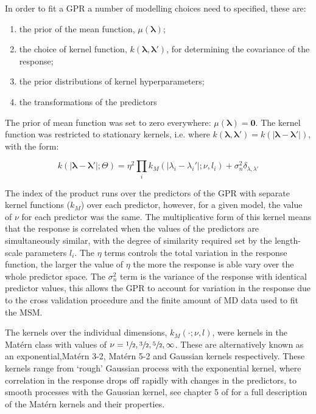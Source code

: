 In order to fit a GPR a number of modelling choices need to specified, these are: 
\begin{enumerate}
    \item the prior of the mean function, $\mu(\mathbf{\lambda})$;
    \item the choice of kernel function, $k(\mathbf{\lambda}, \mathbf{\lambda}')$, for determining the covariance of the response;
    \item the prior distributions of kernel hyperparameters;
    \item the transformations of the predictors 
\end{enumerate}

The prior of mean function  was set to zero everywhere: $\mu(\mathbf{\lambda})=\mathbf{0}$. The kernel function was restricted to stationary kernels, i.e. where $k(\mathbf{\lambda}, \mathbf{\lambda'}) = k(|\mathbf{\lambda} - \mathbf{\lambda'}|)$, with the form: 

\begin{equation}\label{eqn:kernel_form}
    k(|\mathbf{\lambda}-\mathbf{\lambda}'|; \Theta) = 
    \eta^{2}\prod_i k_{M}(|\lambda_{i}-\lambda_{i}'|; \nu, l_i)
    +\sigma_{n}^{2}\delta_{\lambda, \lambda'}
\end{equation}

The index of the product runs over the predictors of the GPR with separate kernel functions ($k_{M}$) over each predictor, however,  for a given model, the value of $\nu$ for each predictor was the same. The multiplicative form of this kernel means that the response is correlated when the values of the predictors are simultaneously similar, with the degree of similarity required set by the length-scale parameters $l_{i}$.  The $\eta$ terms controls the total variation in the response function, the larger the value of $\eta$ the more the response is able vary over the whole predictor space. The $\sigma_{n}^{2}$ term is the variance of the response with identical predictor values, this allows the GPR to account for variation in the response due to the cross validation procedure and the finite amount of MD data used to fit the MSM. 

The kernels over the individual dimensions, $k_{M}(\cdot; \nu, l)$, were kernels in the Mat\'{e}rn class with values of $\nu=\sfrac{1}{2},\sfrac{3}{2},\sfrac{5}{2},\infty$. These are alternatively known as an exponential,Mat\'{e}rn 3-2, Mat\'{e}rn 5-2 and  Gaussian kernels respectively. These kernels range from `rough' Gaussian process with the exponential kernel, where correlation in the response drops off rapidly with changes in the predictors, to smooth processes with the Gaussian kernel, see chapter 5 of \cite{rasmussenGaussianProcessesMachine2006} for a full description of the Mat\'{e}rn kernels and their properties. 

